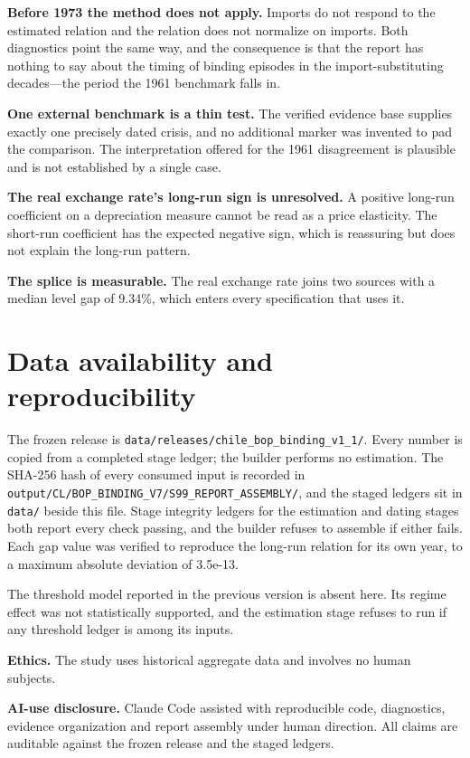 \documentclass[11pt]{article}
\begin{document}
\textbf{Before 1973 the method does not apply.} Imports do not respond to the estimated relation and the relation does not normalize on imports. Both diagnostics point the same way, and the consequence is that the report has nothing to say about the timing of binding episodes in the import-substituting decades---the period the 1961 benchmark falls in.

\textbf{One external benchmark is a thin test.} The verified evidence base supplies exactly one precisely dated crisis, and no additional marker was invented to pad the comparison. The interpretation offered for the 1961 disagreement is plausible and is not established by a single case.

\textbf{The real exchange rate's long-run sign is unresolved.} A positive long-run coefficient on a depreciation measure cannot be read as a price elasticity. The short-run coefficient has the expected negative sign, which is reassuring but does not explain the long-run pattern.

\textbf{The splice is measurable.} The real exchange rate joins two sources with a median level gap of 9.34\%, which enters every specification that uses it.

\FloatBarrier
\section*{Data availability and reproducibility}

The frozen release is \texttt{data/releases/chile\_bop\_binding\_v1\_1/}. Every number is copied from a completed stage ledger; the builder performs no estimation. The SHA-256 hash of every consumed input is recorded in \texttt{output/CL/BOP\_BINDING\_V7/S99\_REPORT\_ASSEMBLY/}, and the staged ledgers sit in \texttt{data/} beside this file. Stage integrity ledgers for the estimation and dating stages both report every check passing, and the builder refuses to assemble if either fails. Each gap value was verified to reproduce the long-run relation for its own year, to a maximum absolute deviation of 3.5e-13.

The threshold model reported in the previous version is absent here. Its regime effect was not statistically supported, and the estimation stage refuses to run if any threshold ledger is among its inputs.

\textbf{Ethics.} The study uses historical aggregate data and involves no human subjects.

\textbf{AI-use disclosure.} Claude Code assisted with reproducible code, diagnostics, evidence organization and report assembly under human direction. All claims are auditable against the frozen release and the staged ledgers.
\end{document}
